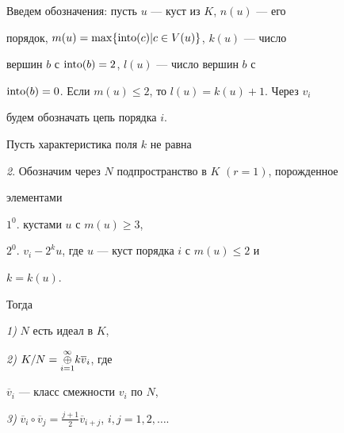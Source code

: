 Введем обозначения: пусть $u$ --- куст из $K$, $n(u)$ --- его


порядок, $m(u)=\max\{\operatorname{into} (c)|c\in V(u)\}$, $k(u)$ --- число


вершин $b$ с $\operatorname{into} (b)=2$, $l(u)$ --- число вершин $b$ с


$\operatorname{into} (b)=0$. Если $m(u)\le 2$, то $l(u)=k(u)+1$. Через $v_i$


будем обозначать цепь порядка $i$.





\begin{prop} Пусть характеристика поля $k$ не равна


{\em 2}. Обозначим через $N$ подпространство в $K$ $(r=1)$, порожденное


элементами





$1^0.$ кустами $u$ с $m(u)\ge 3$,





$2^0.$ $v_i-2^ku$, где $u$ --- куст порядка $i$ с $m(u)\le 2$ и


$k=k(u)$.





\noindent Тогда





{\em 1)} $N$ есть идеал в $K$,





{\em 2)} $K/N = \underset{i=1}{\overset{\infty }{\oplus}}{}k\overline{v}_i$, где


$\overline{v}_i$ --- класс смежности $v_i$ по $N$,





{\em 3)} $\overline{v}_i\circ \overline{v}_j=\frac{j+1}{2}


\overline{v}_{i+j}$, $i,j=1,2,\dotsc $.


\end{prop}





